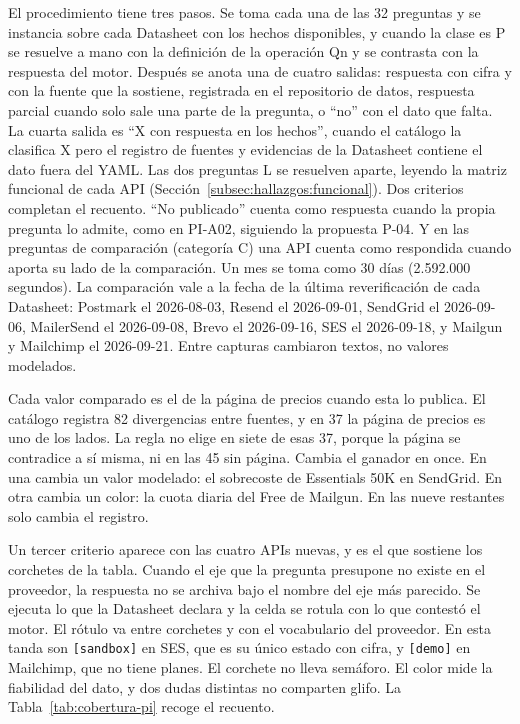 El procedimiento tiene tres pasos. Se toma cada una de las 32 preguntas y se instancia
sobre cada Datasheet con los hechos disponibles, y cuando la clase es P se resuelve a
mano con la definición de la operación Qn y se contrasta con la respuesta del motor.
Después se anota una de cuatro salidas:
respuesta con cifra y con la fuente que la sostiene, registrada en el repositorio de
datos, respuesta parcial cuando solo sale una parte de la pregunta, o ``no'' con el
dato que falta. La cuarta salida es ``X con respuesta en los hechos'', cuando el
catálogo la clasifica X pero el registro de fuentes y evidencias de la Datasheet
contiene el dato fuera del YAML. Las dos preguntas L se resuelven aparte, leyendo la
matriz funcional de cada API (Sección~\ref{subsec:hallazgos:funcional}). Dos criterios
completan el recuento. ``No publicado''
cuenta como respuesta cuando la propia pregunta lo admite, como en PI-A02, siguiendo la
propuesta P-04. Y en las preguntas de comparación (categoría C) una API cuenta como
respondida cuando aporta su lado de la comparación. Un mes se toma como 30 días
(2.592.000 segundos). La comparación vale a la fecha de la última reverificación de
cada Datasheet: Postmark el 2026-08-03, Resend el 2026-09-01, SendGrid el
2026-09-06, MailerSend el 2026-09-08, Brevo el 2026-09-16, SES el 2026-09-18, y Mailgun
y Mailchimp el 2026-09-21. Entre
capturas cambiaron textos, no valores modelados.

Cada valor comparado es el de la página de precios cuando esta lo publica.
El catálogo registra 82 divergencias entre fuentes, y en 37 la página de precios es uno de los lados.
La regla no elige en siete de esas 37, porque la página se contradice a sí misma, ni en las 45 sin página.
Cambia el ganador en once. En una cambia un valor modelado: el sobrecoste de Essentials 50K en SendGrid.
En otra cambia un color: la cuota diaria del Free de Mailgun. En las nueve restantes solo cambia el registro.

Un tercer criterio aparece con las cuatro APIs nuevas, y es el que sostiene los
corchetes de la tabla. Cuando el eje que la pregunta presupone no existe en el
proveedor, la respuesta no se archiva bajo el nombre del eje más parecido. Se ejecuta lo
que la Datasheet declara y la celda se rotula con lo que contestó el motor. El rótulo va
entre corchetes y con el vocabulario del proveedor. En esta tanda son \texttt{[sandbox]} en
SES, que es su único estado con cifra, y \texttt{[demo]} en Mailchimp, que no tiene
planes. El corchete no lleva semáforo. El color mide la fiabilidad del dato, y dos
dudas distintas no comparten glifo. La Tabla~\ref{tab:cobertura-pi} recoge el recuento.


